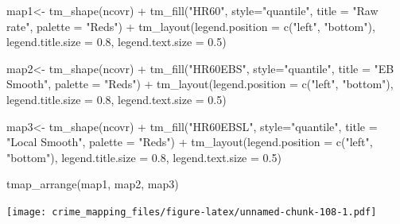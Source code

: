 \documentclass[
]{book}
\newenvironment{Shaded}{\begin{snugshade}}{\end{snugshade}}
\newcommand{\AttributeTok}[1]{\textcolor[rgb]{0.77,0.63,0.00}{#1}}
\newcommand{\FloatTok}[1]{\textcolor[rgb]{0.00,0.00,0.81}{#1}}
\newcommand{\FunctionTok}[1]{\textcolor[rgb]{0.00,0.00,0.00}{#1}}
\newcommand{\NormalTok}[1]{#1}
\newcommand{\OtherTok}[1]{\textcolor[rgb]{0.56,0.35,0.01}{#1}}
\newcommand{\SpecialCharTok}[1]{\textcolor[rgb]{0.00,0.00,0.00}{#1}}
\newcommand{\StringTok}[1]{\textcolor[rgb]{0.31,0.60,0.02}{#1}}
\begin{document}
\begin{Shaded}
\begin{Highlighting}[]
\NormalTok{map1}\OtherTok{\textless{}{-}} \FunctionTok{tm\_shape}\NormalTok{(ncovr) }\SpecialCharTok{+} 
  \FunctionTok{tm\_fill}\NormalTok{(}\StringTok{"HR60"}\NormalTok{, }\AttributeTok{style=}\StringTok{"quantile"}\NormalTok{, }\AttributeTok{title =} \StringTok{"Raw rate"}\NormalTok{, }\AttributeTok{palette =} \StringTok{"Reds"}\NormalTok{) }\SpecialCharTok{+}
  \FunctionTok{tm\_layout}\NormalTok{(}\AttributeTok{legend.position =} \FunctionTok{c}\NormalTok{(}\StringTok{"left"}\NormalTok{, }\StringTok{"bottom"}\NormalTok{), }
            \AttributeTok{legend.title.size =} \FloatTok{0.8}\NormalTok{,}
            \AttributeTok{legend.text.size =} \FloatTok{0.5}\NormalTok{)}

\NormalTok{map2}\OtherTok{\textless{}{-}} \FunctionTok{tm\_shape}\NormalTok{(ncovr) }\SpecialCharTok{+} 
  \FunctionTok{tm\_fill}\NormalTok{(}\StringTok{"HR60EBS"}\NormalTok{, }\AttributeTok{style=}\StringTok{"quantile"}\NormalTok{, }\AttributeTok{title =} \StringTok{"EB Smooth"}\NormalTok{, }\AttributeTok{palette =} \StringTok{"Reds"}\NormalTok{) }\SpecialCharTok{+}
  \FunctionTok{tm\_layout}\NormalTok{(}\AttributeTok{legend.position =} \FunctionTok{c}\NormalTok{(}\StringTok{"left"}\NormalTok{, }\StringTok{"bottom"}\NormalTok{), }
            \AttributeTok{legend.title.size =} \FloatTok{0.8}\NormalTok{,}
            \AttributeTok{legend.text.size =} \FloatTok{0.5}\NormalTok{)}

\NormalTok{map3}\OtherTok{\textless{}{-}} \FunctionTok{tm\_shape}\NormalTok{(ncovr) }\SpecialCharTok{+} 
  \FunctionTok{tm\_fill}\NormalTok{(}\StringTok{"HR60EBSL"}\NormalTok{, }\AttributeTok{style=}\StringTok{"quantile"}\NormalTok{, }\AttributeTok{title =} \StringTok{"Local Smooth"}\NormalTok{, }\AttributeTok{palette =} \StringTok{"Reds"}\NormalTok{) }\SpecialCharTok{+}
  \FunctionTok{tm\_layout}\NormalTok{(}\AttributeTok{legend.position =} \FunctionTok{c}\NormalTok{(}\StringTok{"left"}\NormalTok{, }\StringTok{"bottom"}\NormalTok{), }
            \AttributeTok{legend.title.size =} \FloatTok{0.8}\NormalTok{,}
            \AttributeTok{legend.text.size =} \FloatTok{0.5}\NormalTok{)}

\FunctionTok{tmap\_arrange}\NormalTok{(map1, map2, map3) }
\end{Highlighting}
\end{Shaded}

\texttt{[image: crime\_mapping\_files/figure-latex/unnamed-chunk-108-1.pdf]}
\end{document}
